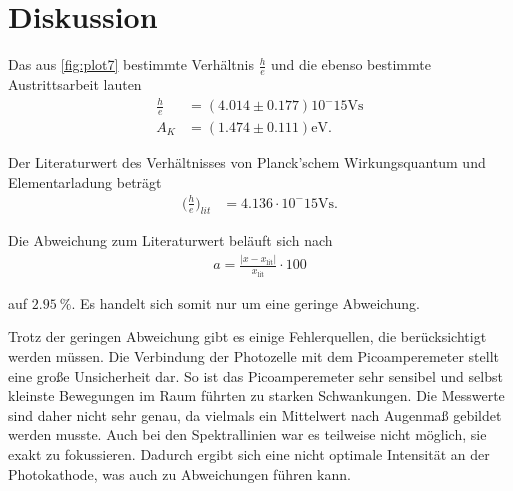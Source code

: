 \section{Diskussion}
\label{sec:Diskussion}

Das aus \autoref{fig:plot7} bestimmte Verhältnis $\frac{h}{e}$ und die ebenso bestimmte Austrittsarbeit lauten
\begin{align*}
    \frac{h}{e} &= (4.014 \pm 0.177) 10^-15 \si{\volt\second} \\
    A_K &=  (1.474 \pm 0.111) \si{\electronvolt}.
\end{align*}

Der Literaturwert des Verhältnisses von Planck'schem Wirkungsquantum\cite{Planck} und Elementarladung\cite{Elementarladung} beträgt
\begin{align*}
    \bigl(\frac{h}{e}\bigr)_{lit} &= 4.136 \cdot 10^-15 \si{\volt\second}.
\end{align*}

Die Abweichung zum Literaturwert beläuft sich nach
\begin{align*}
    a=\frac{|x-x_{\text{lit}}|}{x_{\text{lit}}}\cdot 100 \label{eqn:abweich}
\end{align*}

auf $\qty{2.95}{\percent}$. Es handelt sich somit nur um eine geringe Abweichung.

Trotz der geringen Abweichung gibt es einige Fehlerquellen, die berücksichtigt werden müssen.
Die Verbindung der Photozelle mit dem Picoamperemeter stellt eine große Unsicherheit dar.
So ist das Picoamperemeter sehr sensibel und selbst kleinste Bewegungen im Raum führten zu starken Schwankungen.
Die Messwerte sind daher nicht sehr genau, da vielmals ein Mittelwert nach Augenmaß gebildet werden musste.
Auch bei den Spektrallinien war es teilweise nicht möglich, sie exakt zu fokussieren. Dadurch ergibt sich eine nicht optimale Intensität
an der Photokathode, was auch zu Abweichungen führen kann.


